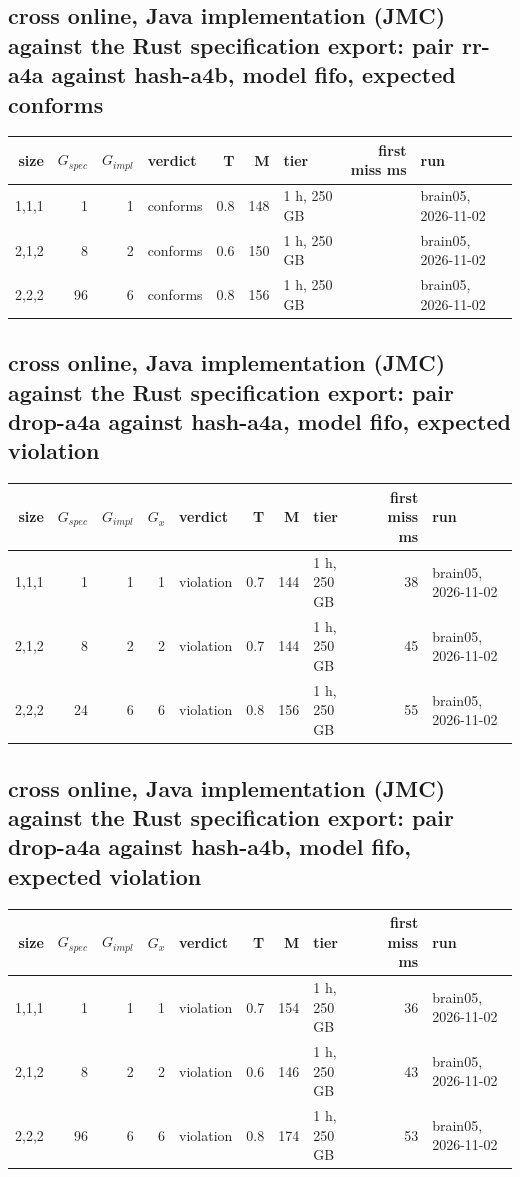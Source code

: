 \documentclass[10pt]{article}
\begin{document}
\subsection*{cross online, Java implementation (JMC) against the Rust specification export: pair \textsf{rr-a4a} against \textsf{hash-a4b}, model fifo, expected conforms}
\begin{longtable}{@{}rrrlrrlrl@{}}
\toprule
size & $G_{\mathit{spec}}$ & $G_{\mathit{impl}}$ & verdict & T & M & tier & first miss ms & run \\
\midrule
\endhead
\color{red} 1,1,1 & 1 & 1 & conforms & 0.8 & 148 & 1 h, 250 GB &  & brain05, 2026-11-02 \\
\color{red} 2,1,2 & 8 & 2 & conforms & 0.6 & 150 & 1 h, 250 GB &  & brain05, 2026-11-02 \\
\color{red} 2,2,2 & 96 & 6 & conforms & 0.8 & 156 & 1 h, 250 GB &  & brain05, 2026-11-02 \\
\bottomrule
\end{longtable}
\subsection*{cross online, Java implementation (JMC) against the Rust specification export: pair \textsf{drop-a4a} against \textsf{hash-a4a}, model fifo, expected violation}
\begin{longtable}{@{}rrrrlrrlrl@{}}
\toprule
size & $G_{\mathit{spec}}$ & $G_{\mathit{impl}}$ & $G_x$ & verdict & T & M & tier & first miss ms & run \\
\midrule
\endhead
\color{red} 1,1,1 & 1 & 1 & 1 & violation & 0.7 & 144 & 1 h, 250 GB & 38 & brain05, 2026-11-02 \\
\color{red} 2,1,2 & 8 & 2 & 2 & violation & 0.7 & 144 & 1 h, 250 GB & 45 & brain05, 2026-11-02 \\
\color{red} 2,2,2 & 24 & 6 & 6 & violation & 0.8 & 156 & 1 h, 250 GB & 55 & brain05, 2026-11-02 \\
\bottomrule
\end{longtable}
\subsection*{cross online, Java implementation (JMC) against the Rust specification export: pair \textsf{drop-a4a} against \textsf{hash-a4b}, model fifo, expected violation}
\begin{longtable}{@{}rrrrlrrlrl@{}}
\toprule
size & $G_{\mathit{spec}}$ & $G_{\mathit{impl}}$ & $G_x$ & verdict & T & M & tier & first miss ms & run \\
\midrule
\endhead
\color{red} 1,1,1 & 1 & 1 & 1 & violation & 0.7 & 154 & 1 h, 250 GB & 36 & brain05, 2026-11-02 \\
\color{red} 2,1,2 & 8 & 2 & 2 & violation & 0.6 & 146 & 1 h, 250 GB & 43 & brain05, 2026-11-02 \\
\color{red} 2,2,2 & 96 & 6 & 6 & violation & 0.8 & 174 & 1 h, 250 GB & 53 & brain05, 2026-11-02 \\
\bottomrule
\end{longtable}
\end{document}
